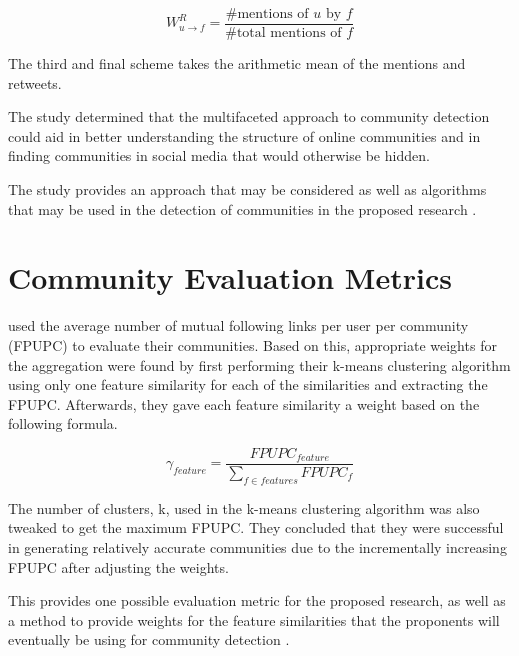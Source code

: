 \begin{equation}
	W_{u \to f}^{R} = \frac{\text{\# mentions of $u$ by $f$}}{\text{\# total mentions of $f$}}
\end{equation}

The third and final scheme takes the arithmetic mean of the mentions and retweets.

The study determined that the multifaceted approach to community detection could aid in better understanding the structure of online communities and in finding communities in social media that would otherwise be hidden.

The study provides an approach that may be considered as well as algorithms that may be used in the detection of communities in the proposed research \cite{Darmon:2015}.

\section{Community Evaluation Metrics}

 used the average number of mutual following links per user per community (FPUPC) to evaluate their communities. Based on this, appropriate weights for the aggregation were found by first performing their k-means clustering algorithm using only one feature similarity for each of the similarities and extracting the FPUPC. Afterwards, they gave each feature similarity a weight based on the following formula. 

\begin{equation}
	\gamma_{feature} = \frac{FPUPC_{feature}}{\sum_{f \in features} FPUPC_f}
\end{equation}

The number of clusters, k, used in the k-means clustering algorithm was also tweaked to get the maximum FPUPC. They concluded that they were successful in generating relatively accurate communities due to the incrementally increasing FPUPC after adjusting the weights.

This provides one possible evaluation metric for the proposed research, as well as a method to provide weights for the feature similarities that the proponents will eventually be using for community detection \cite{Zhang:2012}.